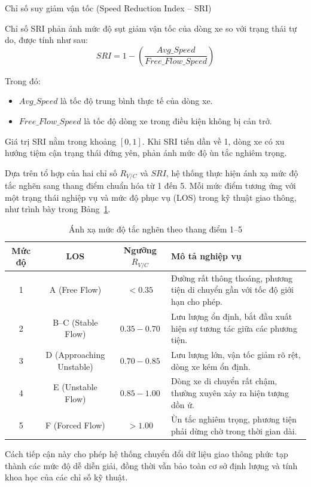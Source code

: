 Chỉ số suy giảm vận tốc (Speed Reduction Index -- SRI)

Chỉ số SRI phản ánh mức độ sụt giảm vận tốc của dòng xe so với trạng thái tự do, được tính như sau:
\[
SRI = 1 - \left( \frac{Avg\_Speed}{Free\_Flow\_Speed} \right)
\]

Trong đó:
\begin{itemize}
    \item $Avg\_Speed$ là tốc độ trung bình thực tế của dòng xe.
    \item $Free\_Flow\_Speed$ là tốc độ dòng xe trong điều kiện không bị cản trở.
\end{itemize}

Giá trị SRI nằm trong khoảng $[0,1]$. Khi SRI tiến dần về 1, dòng xe có xu hướng tiệm cận trạng thái đứng yên, phản ánh mức độ ùn tắc nghiêm trọng.


Dựa trên tổ hợp của hai chỉ số $R_{V/C}$ và $SRI$, hệ thống thực hiện ánh xạ mức độ tắc nghẽn sang thang điểm chuẩn hóa từ 1 đến 5. Mỗi mức điểm tương ứng với một trạng thái nghiệp vụ và mức độ phục vụ (LOS) trong kỹ thuật giao thông, như trình bày trong Bảng~\ref{tab:los_mapping}.

\begin{table}[H]
\centering
\caption{Ánh xạ mức độ tắc nghẽn theo thang điểm 1--5}
\label{tab:los_mapping}
\begin{tabular}{|c|c|c|p{7cm}|}
\hline
\textbf{Mức độ} & \textbf{LOS} & \textbf{Ngưỡng $R_{V/C}$} & \textbf{Mô tả nghiệp vụ} \\ \hline
1 & A (Free Flow) & $< 0.35$ & Đường rất thông thoáng, phương tiện di chuyển gần với tốc độ giới hạn cho phép. \\ \hline
2 & B--C (Stable Flow) & $0.35 - 0.70$ & Lưu lượng ổn định, bắt đầu xuất hiện sự tương tác giữa các phương tiện. \\ \hline
3 & D (Approaching Unstable) & $0.70 - 0.85$ & Lưu lượng lớn, vận tốc giảm rõ rệt, dòng xe kém ổn định. \\ \hline
4 & E (Unstable Flow) & $0.85 - 1.00$ & Dòng xe di chuyển rất chậm, thường xuyên xảy ra hiện tượng dồn ứ. \\ \hline
5 & F (Forced Flow) & $> 1.00$ & Ùn tắc nghiêm trọng, phương tiện phải dừng chờ trong thời gian dài. \\ \hline
\end{tabular}
\end{table}

Cách tiếp cận này cho phép hệ thống chuyển đổi dữ liệu giao thông phức tạp thành các mức độ dễ diễn giải, đồng thời vẫn bảo toàn cơ sở định lượng và tính khoa học của các chỉ số kỹ thuật.


